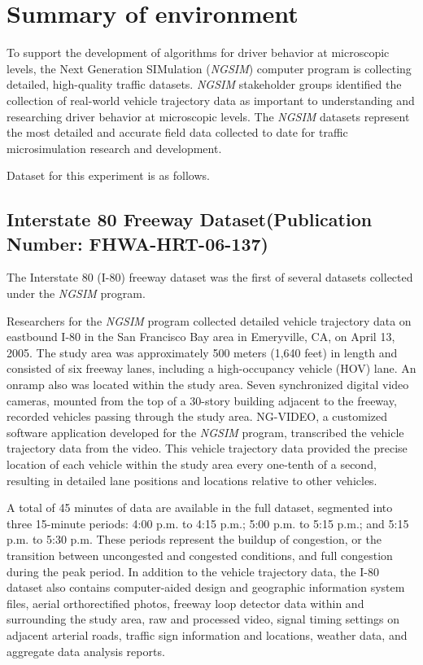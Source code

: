 \pagebreak
\section{Summary of environment}

To support the development of algorithms for driver behavior at microscopic levels, the Next Generation SIMulation ({\it NGSIM}) computer program is collecting detailed, high-quality traffic datasets. {\it NGSIM} stakeholder groups identified the collection of real-world vehicle trajectory data as important to understanding and researching driver behavior at microscopic levels. The {\it NGSIM} datasets represent the most detailed and accurate field data collected to date for traffic microsimulation research and development. 





Dataset for this experiment is as follows.


\subsection{Interstate 80 Freeway Dataset(Publication Number: FHWA-HRT-06-137)}

The Interstate 80 (I-80) freeway dataset was the first of several datasets collected under the {\it NGSIM} program.

Researchers for the {\it NGSIM} program collected detailed vehicle trajectory data on eastbound I-80 in the San Francisco Bay area in Emeryville, CA, on April 13, 2005. The study area was approximately 500 meters (1,640 feet) in length and consisted of six freeway lanes, including a high-occupancy vehicle (HOV) lane. An onramp also was located within the study area. Seven synchronized digital video cameras, mounted from the top of a 30-story building adjacent to the freeway, recorded vehicles passing through the study area. NG-VIDEO, a customized software application developed for the {\it NGSIM} program, transcribed the vehicle trajectory data from the video. This vehicle trajectory data provided the precise location of each vehicle within the study area every one-tenth of a second, resulting in detailed lane positions and locations relative to other vehicles. 

A total of 45 minutes of data are available in the full dataset, segmented into three 15-minute periods: 4:00 p.m. to 4:15 p.m.; 5:00 p.m. to 5:15 p.m.; and 5:15 p.m. to 5:30 p.m. These periods represent the buildup of congestion, or the transition between uncongested and congested conditions, and full congestion during the peak period. In addition to the vehicle trajectory data, the I-80 dataset also contains computer-aided design and geographic information system files, aerial orthorectified photos, freeway loop detector data within and surrounding the study area, raw and processed video, signal timing settings on adjacent arterial roads, traffic sign information and locations, weather data, and aggregate data analysis reports.

